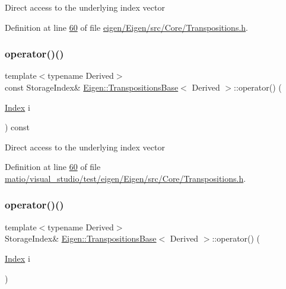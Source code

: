 Direct access to the underlying index vector 

Definition at line \hyperlink{eigen_2_eigen_2src_2_core_2_transpositions_8h_source_l00060}{60} of file \hyperlink{eigen_2_eigen_2src_2_core_2_transpositions_8h_source}{eigen/\+Eigen/src/\+Core/\+Transpositions.\+h}.

\mbox{\label{class_eigen_1_1_transpositions_base_a150860addd2418f37da291f0ad9395f2}} 
\subsubsection{\texorpdfstring{operator()()}{operator()()}\hspace{0.1cm}{\footnotesize\ttfamily [2/4]}}
{\footnotesize\ttfamily template$<$typename Derived$>$ \\
const Storage\+Index\& \hyperlink{class_eigen_1_1_transpositions_base}{Eigen\+::\+Transpositions\+Base}$<$ Derived $>$\+::operator() (\begin{DoxyParamCaption}\item[{\hyperlink{class_eigen_1_1_transpositions_base_a3f5f06118b419e8e6ccbe49ed5b4c91f}{Index}}]{i }\end{DoxyParamCaption}) const\hspace{0.3cm}{\ttfamily [inline]}}

Direct access to the underlying index vector 

Definition at line \hyperlink{matio_2visual__studio_2test_2eigen_2_eigen_2src_2_core_2_transpositions_8h_source_l00060}{60} of file \hyperlink{matio_2visual__studio_2test_2eigen_2_eigen_2src_2_core_2_transpositions_8h_source}{matio/visual\+\_\+studio/test/eigen/\+Eigen/src/\+Core/\+Transpositions.\+h}.

\mbox{\label{class_eigen_1_1_transpositions_base_a8b3eb221d9ec1e51a161d276a0020e24}} 
\subsubsection{\texorpdfstring{operator()()}{operator()()}\hspace{0.1cm}{\footnotesize\ttfamily [3/4]}}
{\footnotesize\ttfamily template$<$typename Derived$>$ \\
Storage\+Index\& \hyperlink{class_eigen_1_1_transpositions_base}{Eigen\+::\+Transpositions\+Base}$<$ Derived $>$\+::operator() (\begin{DoxyParamCaption}\item[{\hyperlink{class_eigen_1_1_transpositions_base_a3f5f06118b419e8e6ccbe49ed5b4c91f}{Index}}]{i }\end{DoxyParamCaption})\hspace{0.3cm}{\ttfamily [inline]}}


